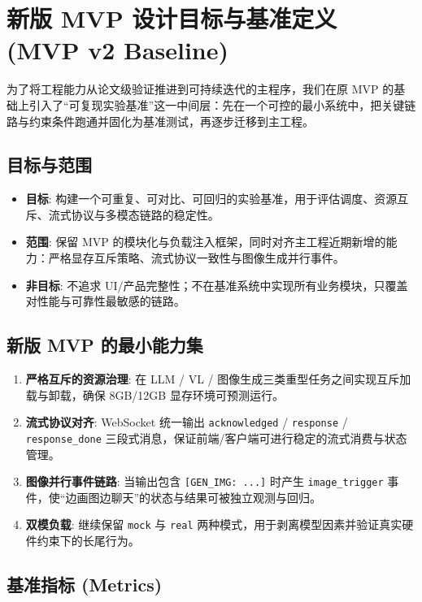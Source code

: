 \documentclass[a4paper,12pt]{article}
\begin{document}
\section{新版 MVP 设计目标与基准定义 (MVP v2 Baseline)}

为了将工程能力从论文级验证推进到可持续迭代的主程序，我们在原 MVP 的基础上引入了“可复现实验基准”这一中间层：先在一个可控的最小系统中，把关键链路与约束条件跑通并固化为基准测试，再逐步迁移到主工程。

\subsection{目标与范围}

\begin{itemize}
    \item \textbf{目标}: 构建一个可重复、可对比、可回归的实验基准，用于评估调度、资源互斥、流式协议与多模态链路的稳定性。
    \item \textbf{范围}: 保留 MVP 的模块化与负载注入框架，同时对齐主工程近期新增的能力：严格显存互斥策略、流式协议一致性与图像生成并行事件。
    \item \textbf{非目标}: 不追求 UI/产品完整性；不在基准系统中实现所有业务模块，只覆盖对性能与可靠性最敏感的链路。
\end{itemize}

\subsection{新版 MVP 的最小能力集}

\begin{enumerate}
    \item \textbf{严格互斥的资源治理}: 在 LLM / VL / 图像生成三类重型任务之间实现互斥加载与卸载，确保 8GB/12GB 显存环境可预测运行。
    \item \textbf{流式协议对齐}: WebSocket 统一输出 \texttt{acknowledged} / \texttt{response} / \texttt{response\_done} 三段式消息，保证前端/客户端可进行稳定的流式消费与状态管理。
    \item \textbf{图像并行事件链路}: 当输出包含 \texttt{[GEN\_IMG: ...]} 时产生 \texttt{image\_trigger} 事件，使“边画图边聊天”的状态与结果可被独立观测与回归。
    \item \textbf{双模负载}: 继续保留 \texttt{mock} 与 \texttt{real} 两种模式，用于剥离模型因素并验证真实硬件约束下的长尾行为。
\end{enumerate}

\subsection{基准指标 (Metrics)}
\end{document}
